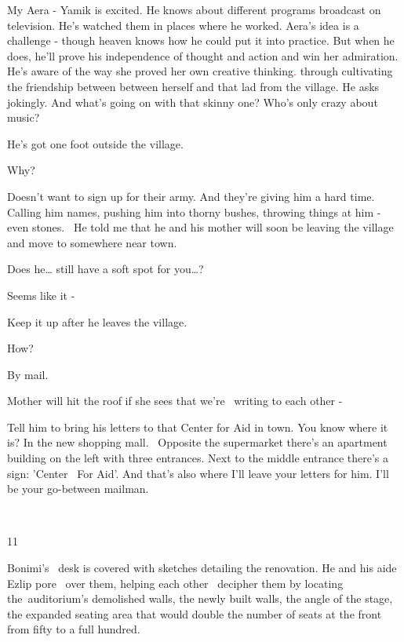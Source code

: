 \documentclass[letterpaper]{article}
\begin{document}
{\textquotedbl}My Aera -{\textquotedbl} Yamik is excited. He knows about different programs broadcast on television.
He's watched them in places where he worked. Aera's idea is a challenge -\newline
 though heaven knows how he could put it into practice. But when he does, he'll prove his independence of thought and
action and win her admiration. He's aware of the way she proved her own creative thinking\textcolor{red}{. }through
cultivating the friendship between between herself and that lad from the village. He asks jokingly. {\textquotedbl}And
what's going on with that skinny one? Who's only crazy about music?{\textquotedbl} 

{\textquotedbl}He's got one foot outside the village.{\textquotedbl} 

{\textquotedbl}Why?{\textquotedbl}

{\textquotedbl}Doesn't want to sign up for their army. And they're giving him a hard time. Calling him names, pushing
him into thorny bushes, throwing things at him - even stones. ~He told me that he and his mother will soon be leaving
the village and move to somewhere near town.{\textquotedbl} 

{\textquotedbl}Does he{\dots} still have a soft spot for you{\dots}?{\textquotedbl} 

{\textquotedbl}Seems like it -{\textquotedbl} 

{\textquotedbl}Keep it up after he leaves the village.{\textquotedbl} 

{\textquotedbl}How?{\textquotedbl} 

{\textquotedbl}By mail.{\textquotedbl} 

{\textquotedbl}Mother will hit the roof if she sees that we're \ writing to each other -{\textquotedbl} 

{\textquotedbl}Tell him to bring his letters to that Center for Aid in town. You know where it is? In the new shopping
mall. \ Opposite the supermarket there's an apartment building on the left with three entrances. Next to the middle
entrance there's a sign: 'Center \ For Aid'. And that's also where I'll leave your letters for him. I'll be your
go-between mailman.{\textquotedbl} 

~

11 

Bonimi's ~desk is covered\textcolor{red}{ }with sketches detailing the renovation. He and his aide Ezlip pore \ over
them, helping each other ~decipher them by locating the~auditorium's demolished walls, the newly built walls, the angle
of the stage, the expanded seating area that would double the number of seats at the front from fifty to a
full\textcolor{red}{ }hundred.~ 
\end{document}
